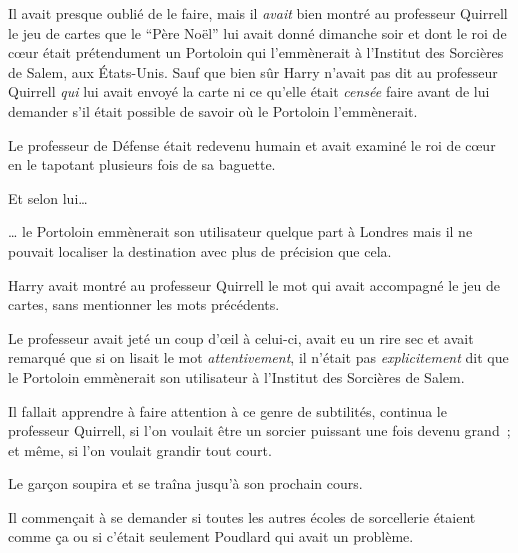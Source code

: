 Il avait presque oublié de le faire, mais il \emph{avait} bien montré au professeur Quirrell le jeu de cartes que le “Père Noël” lui avait donné dimanche soir et dont le roi de cœur était prétendument un Portoloin qui l'emmènerait à l'Institut des Sorcières de Salem, aux États-Unis.
Sauf que bien sûr Harry n'avait pas dit au professeur Quirrell \emph{qui} lui avait envoyé la carte ni ce qu'elle était \emph{censée} faire avant de lui demander s'il était possible de savoir où le Portoloin l'emmènerait.

Le professeur de Défense était redevenu humain et avait examiné le roi de cœur en le tapotant plusieurs fois de sa baguette.

Et selon lui…

… le Portoloin emmènerait son utilisateur quelque part à Londres mais il ne pouvait localiser la destination avec plus de précision que cela.

Harry avait montré au professeur Quirrell le mot qui avait accompagné le jeu de cartes, sans mentionner les mots précédents.

Le professeur avait jeté un coup d'œil à celui-ci, avait eu un rire sec et avait remarqué que si on lisait le mot \emph{attentivement}, il n'était pas \emph{explicitement} dit que le Portoloin emmènerait son utilisateur à l'Institut des Sorcières de Salem.

Il fallait apprendre à faire attention à ce genre de subtilités, continua le professeur Quirrell, si l'on voulait être un sorcier puissant une fois devenu grand~; et même, si l'on voulait grandir tout court.

Le garçon soupira et se traîna jusqu'à son prochain cours.

Il commençait à se demander si toutes les autres écoles de sorcellerie étaient comme ça ou si c'était seulement Poudlard qui avait un problème.
